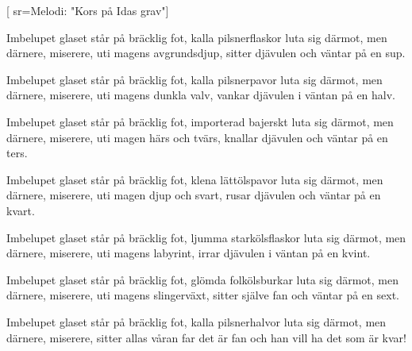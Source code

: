 [ 							
	sr={Melodi: "Kors på Idas grav"}]		
	
\beginverse*						
Imbelupet glaset står på bräcklig fot,
kalla pilsnerflaskor luta sig därmot,
men därnere, miserere, uti magens avgrundsdjup,
sitter djävulen och väntar på en sup.
\endverse						

\beginverse				
Imbelupet glaset står på bräcklig fot,
kalla pilsnerpavor luta sig därmot,
men därnere, miserere, uti magens dunkla valv,
vankar djävulen i väntan på en halv.
\endverse				

\beginverse				
Imbelupet glaset står på bräcklig fot,
importerad bajerskt luta sig därmot,
men därnere, miserere, uti magen härs och tvärs,
knallar djävulen och väntar på en ters.
\endverse				

\beginverse				
Imbelupet glaset står på bräcklig fot,
klena lättölspavor luta sig därmot,
men därnere, miserere, uti magen djup och svart,
rusar djävulen och väntar på en kvart.
\endverse				

\beginverse				
Imbelupet glaset står på bräcklig fot,
ljumma starkölsflaskor luta sig därmot,
men därnere, miserere, uti magens labyrint,
irrar djävulen i väntan på en kvint.
\endverse				

\beginverse				
Imbelupet glaset står på bräcklig fot,
glömda folkölsburkar luta sig därmot,
men därnere, miserere, uti magens slingerväxt,
sitter själve fan och väntar på en sext.
\endverse				

\beginverse				
Imbelupet glaset står på bräcklig fot,
kalla pilsnerhalvor luta sig därmot,
men därnere, miserere, sitter allas våran far
det är fan och han vill ha det som är kvar!
\endverse				
\endsong	
